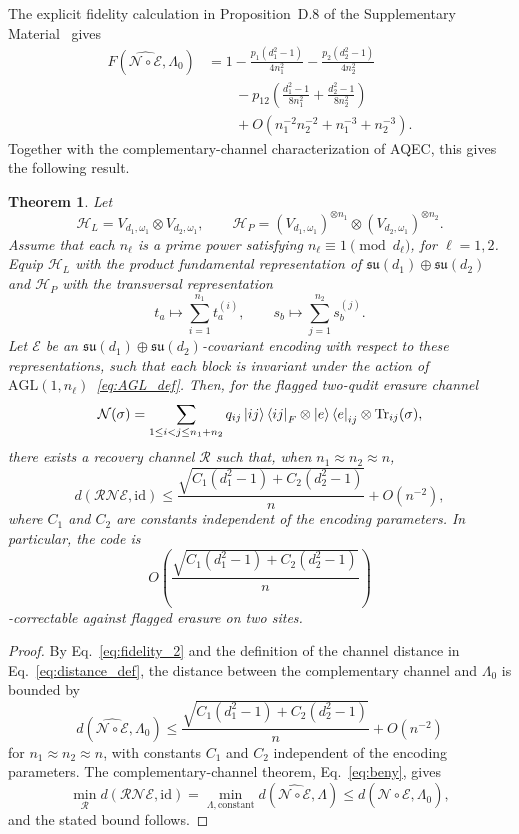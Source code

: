 \documentclass[10pt,twocolumn,superscriptaddress,aps,amsmath,amssymb,citeautoscript,floatfix,prx,longbibliography]{revtex4-2}
\newtheorem{theorem}{Theorem}
\theoremstyle{plain}
\theoremstyle{plain}
\theoremstyle{plain}
\theoremstyle{plain}
\theoremstyle{plain}
\theoremstyle{plain}
\begin{document}
The explicit fidelity calculation in Proposition~D.8 of the Supplementary Material~\cite{SuppMat} gives
\begin{equation}\label{eq:fidelity_2}
\begin{aligned}
F\left(\widehat{\mathcal N\circ\mathcal E},\Lambda_0\right)
&=
1
-
\frac{p_1(d_1^2-1)}{4n_1^2}
-
\frac{p_2(d_2^2-1)}{4n_2^2}
\\
&\qquad
-
p_{12}
\left(
\frac{d_1^2-1}{8n_1^2}
+
\frac{d_2^2-1}{8n_2^2}
\right)
\\
&\qquad
+
O\left(n_1^{-2}n_2^{-2}+n_1^{-3}+n_2^{-3}\right).
\end{aligned}
\end{equation}
Together with the complementary-channel characterization of AQEC, this gives the following result.

\begin{theorem}
Let
$$
\mathcal H_L
=
V_{d_1,\omega_1}
\otimes
V_{d_2,\omega_1},
\qquad
\mathcal H_P
=
(V_{d_1,\omega_1})^{\otimes n_1}
\otimes
(V_{d_2,\omega_1})^{\otimes n_2}.
$$
Assume that each $n_\ell$ is a prime power satisfying $n_\ell\equiv 1\pmod{d_\ell}$, for $\ell=1,2$. Equip $\mathcal H_L$ with the product fundamental representation of $\mathfrak{su}(d_1)\oplus\mathfrak{su}(d_2)$ and $\mathcal H_P$ with the transversal representation
$$
t_a
\longmapsto
\sum_{i=1}^{n_1} t_a^{(i)},
\qquad
s_b
\longmapsto
\sum_{j=1}^{n_2} s_b^{(j)} .
$$
Let $\mathcal E$ be an $\mathfrak{su}(d_1)\oplus\mathfrak{su}(d_2)$-covariant encoding with respect to these representations, such that each block is invariant under the action of $\mathrm{AGL}(1,n_\ell)$~\eqref{eq:AGL_def}. Then, for the flagged two-qudit erasure channel
$$
\mathcal N(\sigma)
=
\sum_{1\le i<j\le n_1+n_2}
q_{ij}
\ket{ij}\bra{ij}_F
\otimes
\ket e\bra e_{ij}
\otimes
\operatorname{Tr}_{ij}(\sigma),
$$
there exists a recovery channel $\mathcal R$ such that, when $n_1\approx n_2\approx n$,
$$
d(\mathcal R\mathcal N\mathcal E,\mathrm{id})
\le
\frac{
\sqrt{
C_1(d_1^2-1)
+
C_2(d_2^2-1)
}
}{n}
+
O(n^{-2}),
$$
where $C_1$ and $C_2$ are constants independent of the encoding parameters. In particular, the code is
$$
O\left(
\frac{
\sqrt{
C_1(d_1^2-1)
+
C_2(d_2^2-1)
}
}{n}
\right)
$$
-correctable against flagged erasure on two sites.
\end{theorem}

\begin{proof}
By Eq.~\eqref{eq:fidelity_2} and the definition of the channel distance in Eq.~\eqref{eq:distance_def}, the distance between the complementary channel and $\Lambda_0$ is bounded by
$$
d\left(\widehat{\mathcal N\circ\mathcal E},\Lambda_0\right)
\le
\frac{
\sqrt{
C_1(d_1^2-1)
+
C_2(d_2^2-1)
}
}{n}
+
O(n^{-2})
$$
for $n_1\approx n_2\approx n$, with constants $C_1$ and $C_2$ independent of the encoding parameters. The complementary-channel theorem, Eq.~\eqref{eq:beny}, gives
$$
\min_{\mathcal R}
d(\mathcal R\mathcal N\mathcal E,\mathrm{id})
=
\min_{\Lambda,\mathrm{constant}}
d\left(\widehat{\mathcal N\circ\mathcal E},\Lambda\right)
\le
d\left(\widehat{\mathcal N\circ\mathcal E},\Lambda_0\right),
$$
and the stated bound follows.
\end{proof}
\end{document}
